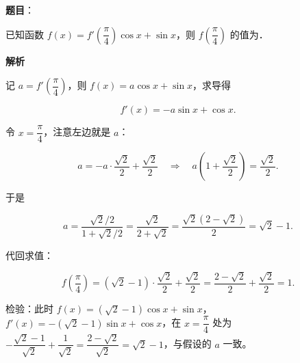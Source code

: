 \begin{answer}

\textbf{题目}：

已知函数 $f(x)=f'\left(\dfrac\pi4\right)\cos x+\sin x$，则 $f\left(\dfrac\pi4\right)$ 的值为\gkblank{}．

\textbf{解析}

记 $a=f'\left(\dfrac\pi4\right)$，则 $f(x)=a\cos x+\sin x$，求导得

\nopagebreak[4]
\[f'(x)=-a\sin x+\cos x.\]

令 $x=\dfrac\pi4$，注意左边就是 $a$：

\nopagebreak[4]
\[a=-a\cdot\frac{\sqrt2}{2}+\frac{\sqrt2}{2}\quad\Longrightarrow\quad a\left(1+\frac{\sqrt2}{2}\right)=\frac{\sqrt2}{2}.\]

于是

\nopagebreak[4]
\[a=\frac{\sqrt2/2}{1+\sqrt2/2}=\frac{\sqrt2}{2+\sqrt2}=\frac{\sqrt2(2-\sqrt2)}{2}=\sqrt2-1.\]

代回求值：

\nopagebreak[4]
\[f\left(\frac\pi4\right)=(\sqrt2-1)\cdot\frac{\sqrt2}{2}+\frac{\sqrt2}{2}
=\frac{2-\sqrt2}{2}+\frac{\sqrt2}{2}=1.\]

检验：此时 $f(x)=(\sqrt2-1)\cos x+\sin x$，$f'(x)=-(\sqrt2-1)\sin x+\cos x$，在 $x=\dfrac\pi4$ 处为 $-\dfrac{\sqrt2-1}{\sqrt2}+\dfrac1{\sqrt2}=\dfrac{2-\sqrt2}{\sqrt2}=\sqrt2-1$，与假设的 $a$ 一致。


\end{answer}
